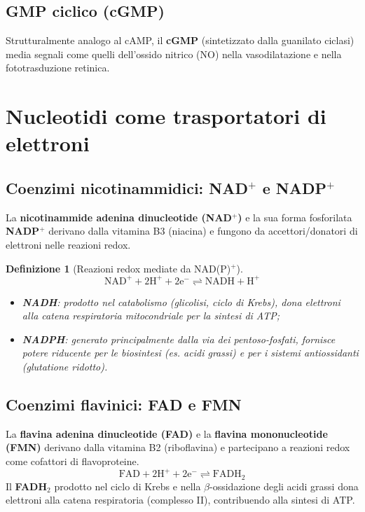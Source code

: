 \documentclass[12pt,a4paper]{report}
\newtheorem{definizione}{Definizione}[section]
\begin{document}
\subsection{GMP ciclico (cGMP)}
Strutturalmente analogo al cAMP, il \textbf{cGMP} (sintetizzato dalla guanilato ciclasi) media segnali come quelli dell'ossido nitrico (NO) nella vasodilatazione e nella fototrasduzione retinica.

\section{Nucleotidi come trasportatori di elettroni}
\subsection{Coenzimi nicotinammidici: NAD$^+$ e NADP$^+$}
La \textbf{nicotinammide adenina dinucleotide (NAD$^+$)} e la sua forma fosforilata \textbf{NADP$^+$} derivano dalla vitamina B3 (niacina) e fungono da accettori/donatori di elettroni nelle reazioni redox.
\begin{definizione}[Reazioni redox mediate da NAD(P)$^+$]
\[
\mathrm{NAD^+ + 2H^+ + 2e^- \rightleftharpoons NADH + H^+}
\]
\begin{itemize}
\item \textbf{NADH}: prodotto nel catabolismo (glicolisi, ciclo di Krebs), dona elettroni alla catena respiratoria mitocondriale per la sintesi di ATP;
\item \textbf{NADPH}: generato principalmente dalla via dei pentoso-fosfati, fornisce potere riducente per le biosintesi (es. acidi grassi) e per i sistemi antiossidanti (glutatione ridotto).
\end{itemize}
\end{definizione}
\subsection{Coenzimi flavinici: FAD e FMN}
La \textbf{flavina adenina dinucleotide (FAD)} e la \textbf{flavina mononucleotide (FMN)} derivano dalla vitamina B2 (riboflavina) e partecipano a reazioni redox come cofattori di flavoproteine.
\[
\mathrm{FAD + 2H^+ + 2e^- \rightleftharpoons FADH_2}
\]
Il \textbf{FADH$_2$} prodotto nel ciclo di Krebs e nella $\beta$-ossidazione degli acidi grassi dona elettroni alla catena respiratoria (complesso II), contribuendo alla sintesi di ATP.
\end{document}
